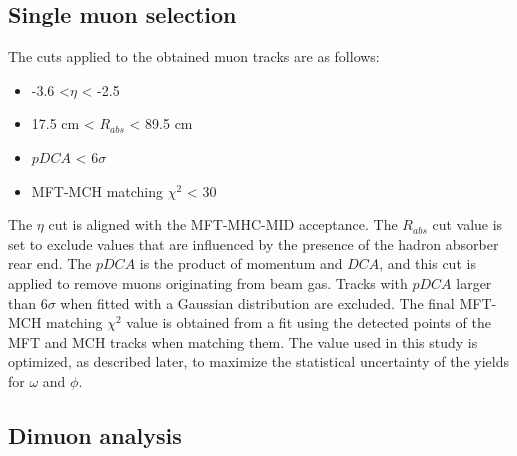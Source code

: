     \subsection{Single muon selection}
    \label{Single_muon_selection}
        The cuts applied to the obtained muon tracks are as follows:
        \begin{itemize}{}
            \item -3.6 <$\eta$ < -2.5
            \item 17.5 cm < $R_{abs}$ < 89.5 cm
            \item $pDCA$ < 6$\sigma$
            \item MFT-MCH matching $\chi^2$ < 30
        \end{itemize}
        The $\eta$ cut is aligned with the MFT-MHC-MID acceptance. The $R_{abs}$ cut value is set to exclude values that are influenced by the presence of the hadron absorber rear end. The $pDCA$ is the product of momentum and $DCA$, and this cut is applied to remove muons originating from beam gas. Tracks with $pDCA$ larger than 6$\sigma$ when fitted with a Gaussian distribution are excluded. 
        The final MFT-MCH matching $\chi^2$ value is obtained from a fit using the detected points of the MFT and MCH tracks when matching them. The value used in this study is optimized, as described later, to maximize the statistical uncertainty of the yields for $\omega$ and $\phi$. 
    
        \subsection{Dimuon analysis}
        \label{Dimuon}
